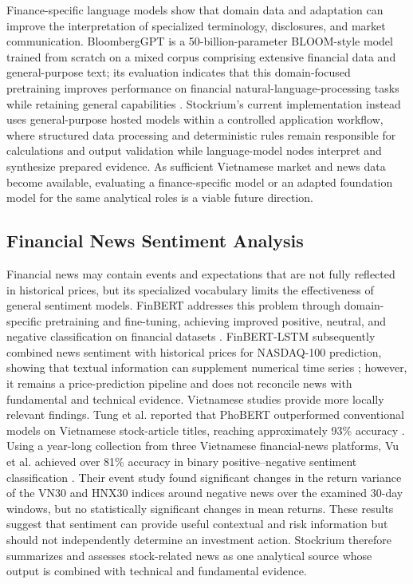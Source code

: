 Finance-specific language models show that domain data and adaptation can improve the interpretation of specialized terminology, disclosures, and market communication. BloombergGPT is a 50-billion-parameter BLOOM-style model trained from scratch on a mixed corpus comprising extensive financial data and general-purpose text; its evaluation indicates that this domain-focused pretraining improves performance on financial natural-language-processing tasks while retaining general capabilities \cite{wu2023bloomberggpt}. Stockrium's current implementation instead uses general-purpose hosted models within a controlled application workflow, where structured data processing and deterministic rules remain responsible for calculations and output validation while language-model nodes interpret and synthesize prepared evidence. As sufficient Vietnamese market and news data become available, evaluating a finance-specific model or an adapted foundation model for the same analytical roles is a viable future direction.

\subsection{Financial News Sentiment Analysis}

Financial news may contain events and expectations that are not fully reflected in historical prices, but its specialized vocabulary limits the effectiveness of general sentiment models. FinBERT addresses this problem through domain-specific pretraining and fine-tuning, achieving improved positive, neutral, and negative classification on financial datasets \cite{araci2019finbert}. FinBERT-LSTM subsequently combined news sentiment with historical prices for NASDAQ-100 prediction, showing that textual information can supplement numerical time series \cite{halder2022finbertlstm}; however, it remains a price-prediction pipeline and does not reconcile news with fundamental and technical evidence. Vietnamese studies provide more locally relevant findings. Tung et al. reported that PhoBERT outperformed conventional models on Vietnamese stock-article titles, reaching approximately 93\% accuracy \cite{tung2021phobert}. Using a year-long collection from three Vietnamese financial-news platforms, Vu et al. achieved over 81\% accuracy in binary positive--negative sentiment classification \cite{vu2023sentiments}. Their event study found significant changes in the return variance of the VN30 and HNX30 indices around negative news over the examined 30-day windows, but no statistically significant changes in mean returns. These results suggest that sentiment can provide useful contextual and risk information but should not independently determine an investment action. Stockrium therefore summarizes and assesses stock-related news as one analytical source whose output is combined with technical and fundamental evidence.

